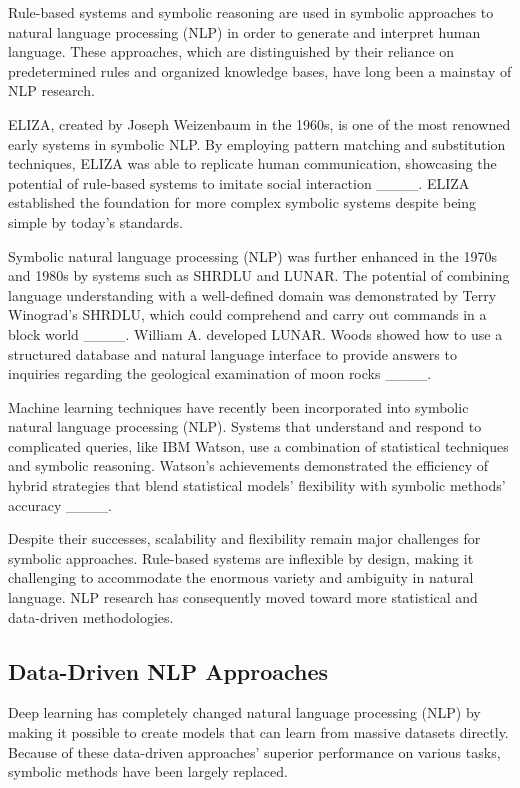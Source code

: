 Rule-based systems and symbolic reasoning are used in symbolic approaches to natural language processing (NLP) in order to generate and interpret human language. These approaches, which are distinguished by their reliance on predetermined rules and organized knowledge bases, have long been a mainstay of NLP research. 

ELIZA, created by Joseph Weizenbaum in the 1960s, is one of the most renowned early systems in symbolic NLP. By employing pattern matching and substitution techniques, ELIZA was able to replicate human communication, showcasing the potential of rule-based systems to imitate social interaction ____. ELIZA established the foundation for more complex symbolic systems despite being simple by today's standards.

Symbolic natural language processing (NLP) was further enhanced in the 1970s and 1980s by systems such as SHRDLU and LUNAR. The potential of combining language understanding with a well-defined domain was demonstrated by Terry Winograd's SHRDLU, which could comprehend and carry out commands in a block world ____. William A. developed LUNAR. Woods showed how to use a structured database and natural language interface to provide answers to inquiries regarding the geological examination of moon rocks ____.

Machine learning techniques have recently been incorporated into symbolic natural language processing (NLP). Systems that understand and respond to complicated queries, like IBM Watson, use a combination of statistical techniques and symbolic reasoning. Watson's achievements demonstrated the efficiency of hybrid strategies that blend statistical models' flexibility with symbolic methods' accuracy ____.

Despite their successes, scalability and flexibility remain major challenges for symbolic approaches. Rule-based systems are inflexible by design, making it challenging to accommodate the enormous variety and ambiguity in natural language. NLP research has consequently moved toward more statistical and data-driven methodologies.

\subsection{Data-Driven NLP Approaches}

Deep learning has completely changed natural language processing (NLP) by making it possible to create models that can learn from massive datasets directly. Because of these data-driven approaches' superior performance on various tasks, symbolic methods have been largely replaced. 

